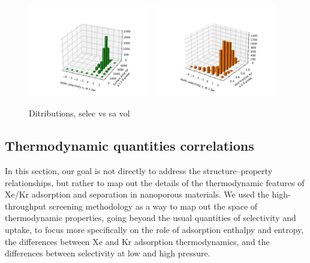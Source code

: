 \documentclass[main.tex]{subfiles}
\begin{document}
\begin{figure}[ht]
  \centering
  \includegraphics[width=0.48\textwidth]{figures/2-thermo/3D_hist_selec_SA.pdf}
  \includegraphics[width=0.48\textwidth]{figures/2-thermo/3D_hist_selec_vol.pdf}
  \caption{Ditributions, selec vs sa vol}
\end{figure}




\clearpage
\subsection{Thermodynamic quantities correlations}

In this section, our goal is not directly to address the structure--property relationships, but rather to map out the details of the thermodynamic features of Xe/Kr adsorption and separation in nanoporous materials. We used the high-throughput screening methodology as a way to map out the space of thermodynamic properties, going beyond the usual quantities of selectivity and uptake, to focus more specifically on the role of adsorption enthalpy and entropy, the differences between Xe and Kr adsorption thermodynamics, and the differences between selectivity at low and high pressure.
\end{document}
